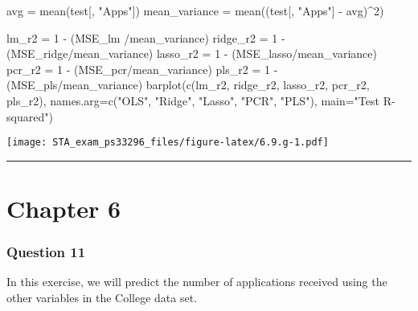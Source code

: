 \documentclass[
]{article}
\newenvironment{Shaded}{\begin{snugshade}}{\end{snugshade}}
\newcommand{\AttributeTok}[1]{\textcolor[rgb]{0.77,0.63,0.00}{#1}}
\newcommand{\DecValTok}[1]{\textcolor[rgb]{0.00,0.00,0.81}{#1}}
\newcommand{\FunctionTok}[1]{\textcolor[rgb]{0.00,0.00,0.00}{#1}}
\newcommand{\NormalTok}[1]{#1}
\newcommand{\OtherTok}[1]{\textcolor[rgb]{0.56,0.35,0.01}{#1}}
\newcommand{\SpecialCharTok}[1]{\textcolor[rgb]{0.00,0.00,0.00}{#1}}
\newcommand{\StringTok}[1]{\textcolor[rgb]{0.31,0.60,0.02}{#1}}
\begin{document}
\begin{Shaded}
\begin{Highlighting}[]
\NormalTok{avg }\OtherTok{=} \FunctionTok{mean}\NormalTok{(test[, }\StringTok{"Apps"}\NormalTok{])}
\NormalTok{mean\_variance }\OtherTok{=} \FunctionTok{mean}\NormalTok{((test[, }\StringTok{"Apps"}\NormalTok{] }\SpecialCharTok{{-}}\NormalTok{ avg)}\SpecialCharTok{\^{}}\DecValTok{2}\NormalTok{)}

\NormalTok{lm\_r2 }\OtherTok{=} \DecValTok{1} \SpecialCharTok{{-}}\NormalTok{ (MSE\_lm }\SpecialCharTok{/}\NormalTok{mean\_variance)}
\NormalTok{ridge\_r2 }\OtherTok{=} \DecValTok{1} \SpecialCharTok{{-}}\NormalTok{ (MSE\_ridge}\SpecialCharTok{/}\NormalTok{mean\_variance)}
\NormalTok{lasso\_r2 }\OtherTok{=} \DecValTok{1} \SpecialCharTok{{-}}\NormalTok{ (MSE\_lasso}\SpecialCharTok{/}\NormalTok{mean\_variance)}
\NormalTok{pcr\_r2 }\OtherTok{=} \DecValTok{1} \SpecialCharTok{{-}}\NormalTok{ (MSE\_pcr}\SpecialCharTok{/}\NormalTok{mean\_variance)}
\NormalTok{pls\_r2 }\OtherTok{=} \DecValTok{1} \SpecialCharTok{{-}}\NormalTok{ (MSE\_pls}\SpecialCharTok{/}\NormalTok{mean\_variance)}
\FunctionTok{barplot}\NormalTok{(}\FunctionTok{c}\NormalTok{(lm\_r2, ridge\_r2, lasso\_r2, pcr\_r2, pls\_r2), }\AttributeTok{names.arg=}\FunctionTok{c}\NormalTok{(}\StringTok{"OLS"}\NormalTok{, }\StringTok{"Ridge"}\NormalTok{, }\StringTok{"Lasso"}\NormalTok{, }\StringTok{"PCR"}\NormalTok{, }\StringTok{"PLS"}\NormalTok{), }\AttributeTok{main=}\StringTok{"Test R{-}squared"}\NormalTok{)}
\end{Highlighting}
\end{Shaded}

\texttt{[image: STA\_exam\_ps33296\_files/figure-latex/6.9.g-1.pdf]}

\begin{center}\rule{0.5\linewidth}{0.5pt}\end{center}

\hypertarget{chapter-6-1}{%
\section{Chapter 6}\label{chapter-6-1}}

\hypertarget{question-11}{%
\subsubsection{Question 11}\label{question-11}}

In this exercise, we will predict the number of applications received
using the other variables in the College data set.
\end{document}

